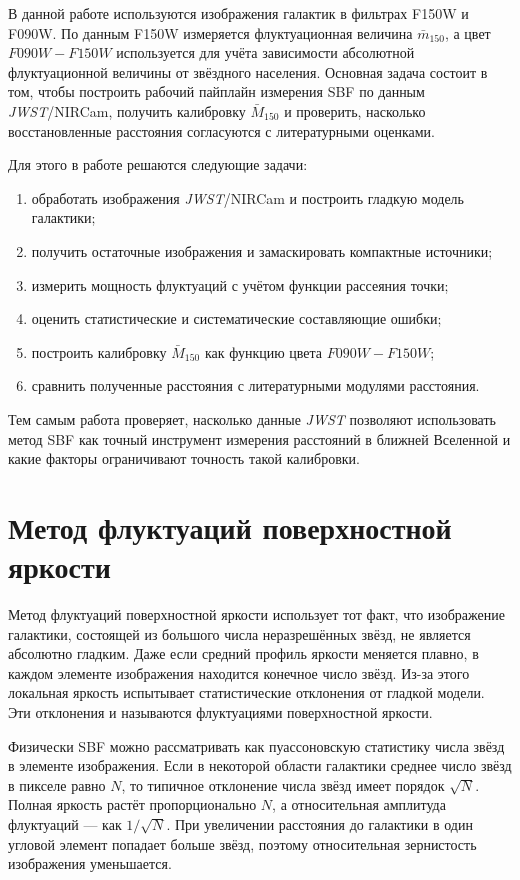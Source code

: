 \documentclass[12pt,a4paper]{article}
\begin{document}
В данной работе используются изображения галактик в фильтрах F150W и F090W. 
По данным F150W измеряется флуктуационная величина $\bar{m}_{150}$, а цвет $F090W-F150W$ используется для учёта зависимости абсолютной флуктуационной величины от звёздного населения. 
Основная задача состоит в том, чтобы построить рабочий пайплайн измерения SBF по данным \textit{JWST}/NIRCam, получить калибровку $\bar{M}_{150}$ и проверить, насколько восстановленные расстояния согласуются с литературными оценками.

Для этого в работе решаются следующие задачи:
\begin{enumerate}
    \item обработать изображения \textit{JWST}/NIRCam и построить гладкую модель галактики;
    \item получить остаточные изображения и замаскировать компактные источники;
    \item измерить мощность флуктуаций с учётом функции рассеяния точки;
    \item оценить статистические и систематические составляющие ошибки;
    \item построить калибровку $\bar{M}_{150}$ как функцию цвета $F090W-F150W$;
    \item сравнить полученные расстояния с литературными модулями расстояния.
\end{enumerate}

Тем самым работа проверяет, насколько данные \textit{JWST} позволяют использовать метод SBF как точный инструмент измерения расстояний в ближней Вселенной и какие факторы ограничивают точность такой калибровки.

\section{Метод флуктуаций поверхностной яркости}

Метод флуктуаций поверхностной яркости использует тот факт, что изображение галактики, состоящей из большого числа неразрешённых звёзд, не является абсолютно гладким. Даже если средний профиль яркости меняется плавно, в каждом элементе изображения находится конечное число звёзд. Из-за этого локальная яркость испытывает статистические отклонения от гладкой модели. Эти отклонения и называются флуктуациями поверхностной яркости.

Физически SBF можно рассматривать как пуассоновскую статистику числа звёзд в элементе изображения. Если в некоторой области галактики среднее число звёзд в пикселе равно $N$, то типичное отклонение числа звёзд имеет порядок $\sqrt{N}$. Полная яркость растёт пропорционально $N$, а относительная амплитуда флуктуаций --- как $1/\sqrt{N}$. При увеличении расстояния до галактики в один угловой элемент попадает больше звёзд, поэтому относительная зернистость изображения уменьшается.
\end{document}
